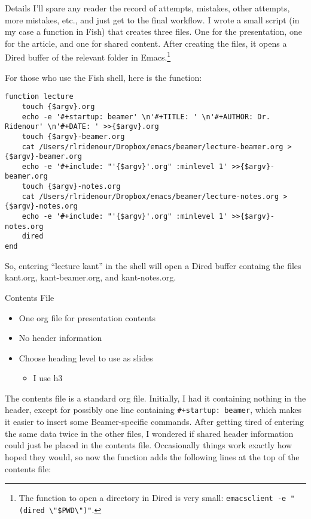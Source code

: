 \documentclass[11pt]{article}
\begin{document}
\begin{frame}[label={sec:org67b5962},fragile]{Details}
 I'll spare any reader the record of attempts, mistakes, other attempts, more mistakes, etc., and just get to the final workflow. I wrote a small script (in my case a function in Fish) that creates three files. One for the presentation, one for the article, and one for shared content. After creating the files, it opens a Dired buffer of the relevant folder in Emacs.\footnote{The function to open a directory in Dired is very small: \texttt{emacsclient -e "(dired \textbackslash{}"\$PWD\textbackslash{}")"}.}

For those who use the Fish shell, here is the function:

\begin{verbatim}
function lecture
    touch {$argv}.org
    echo -e '#+startup: beamer' \n'#+TITLE: ' \n'#+AUTHOR: Dr. Ridenour' \n'#+DATE: ' >>{$argv}.org
    touch {$argv}-beamer.org
    cat /Users/rlridenour/Dropbox/emacs/beamer/lecture-beamer.org >{$argv}-beamer.org
    echo -e '#+include: "'{$argv}'.org" :minlevel 1' >>{$argv}-beamer.org
    touch {$argv}-notes.org
    cat /Users/rlridenour/Dropbox/emacs/beamer/lecture-notes.org >{$argv}-notes.org
    echo -e '#+include: "'{$argv}'.org" :minlevel 1' >>{$argv}-notes.org
    dired
end
\end{verbatim}
So, entering  ``lecture kant'' in the shell will open a Dired buffer containg the files kant.org, kant-beamer.org, and kant-notes.org.

\begin{block}{Contents File}
\begin{itemize}
\item One org file for presentation contents
\item No header information
\item Choose heading level to use as slides
\begin{itemize}
\item I use h3
\end{itemize}
\end{itemize}
\end{block}

The contents file is a standard org file. Initially, I had it containing nothing in the header, except for possibly one line containing \texttt{\#+startup: beamer}, which makes it easier to insert some Beamer-specific commands. After getting tired of entering the same data twice in the other files, I wondered if shared header information could just be placed in the contents file. Occasionally things work exactly how hoped they would, so now the function adds the following lines at the top of the contents file:


\end{frame}
\end{document}
